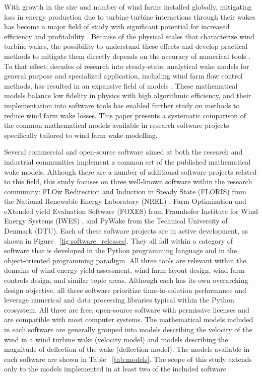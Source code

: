 \documentclass{iopconfser}
\newcommand{\ind}[]{\hspace{6mm}}
\begin{document}
With growth in the size and number of wind farms installed globally, mitigating loss in energy production due to turbine-turbine interactions through their wakes has become a major field of study with significant potential for increased efficiency and profitability \cite{meyers2022wind}.
Because of the physical scales that characterize wind turbine wakes, the possibility to understand these effects and develop practical methods to mitigate them directly depends on the accuracy of numerical tools \cite{ning2019systems,boccolini2021wind}.
To that effect, decades of research into steady-state, analytical wake models for general purpose and specialized application, including wind farm flow control methods, has resulted in an expansive field of models \cite{porteagel2020wind}.
These mathematical models balance low fidelity in physics with high algorithmic efficiency, and their implementation into software tools has enabled further study on methods to reduce wind farm wake losses.
This paper presents a systematic comparison of the common mathematical models available in research software projects specifically tailored to wind farm wake modelling.

\ind{}Several commercial and open-source software aimed at both the research and industrial communities implement a common set of the published mathematical wake models.
Although there are a number of additional software projects related to this field, this study focuses on three well-known software within the research community: FLOw Redirection and Induction in Steady State (FLORIS) from the National Renewable Energy Laboratory (NREL) \cite{floris36}, Farm Optimization and eXtended yield Evaluation Software (FOXES) from Fraunhofer Institute for Wind Energy Systems (IWES) \cite{foxes,foxes062}, and PyWake from the Technical University of Denmark \cite{pywake25} (DTU).
Each of these software projects are in active development, as shown in Figure ~\ref{fig:software_releases}.
They all fall within a category of software that is developed in the Python programming language and in the object-oriented programming paradigm.
All three tools are relevant within the domains of wind energy yield assessment, wind farm layout design, wind farm controls design, and similar topic areas.
Although each has its own overarching design objective, all three software prioritize time-to-solution performance and leverage numerical and data processing libraries typical within the Python ecosystem.
All three are free, open-source software with permissive licenses and are compatible with most computer systems.
The mathematical models included in each software are generally grouped into models describing the velocity of the wind in a wind turbine wake (velocity model) and models describing the magnitude of deflection of the wake (deflection model). The models available in each software are shown in Table ~\ref{tab:models}.
The scope of this study extends only to the models implemented in at least two of the included software.
\end{document}
